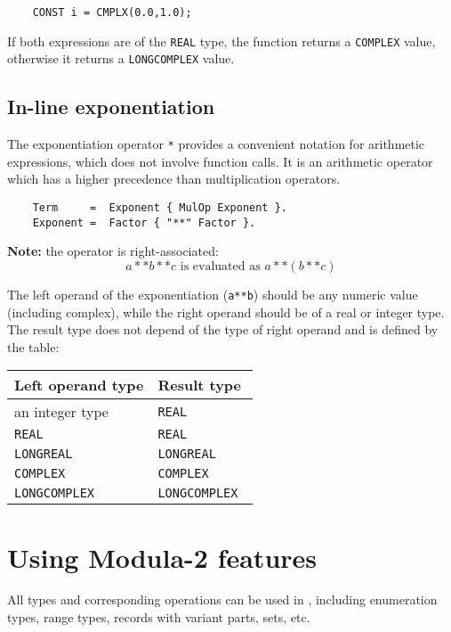 \verb'    CONST i = CMPLX(0.0,1.0);'

If both expressions are of the \verb'REAL' type, the function
returns a \verb'COMPLEX' value, otherwise it returns a
\verb'LONGCOMPLEX' value.

\subsection{In-line exponentiation}

\onumextonly{}

The exponentiation operator {\tt **} provides a convenient
notation for arithmetic expressions, which does not involve function
calls. It is an arithmetic operator which has a higher precedence
than multiplication operators.
\begin{verbatim}
    Term     =  Exponent { MulOp Exponent }.
    Exponent =  Factor { "**" Factor }.
\end{verbatim}
{\bf Note:} the operator is right-associated:
$$
  a**b**c \mbox{ is evaluated as } a**(b**c)
$$

The left operand of the exponentiation ({\tt a**b}) should be any
numeric value (including complex), while the right operand should
be of a real or integer type. The result type does not depend of
the type of right operand and is defined by the table:
\begin{center}
\begin{tabular}{ll}
\bf Left operand type & \bf Result type \\ \hline
an integer type     & \tt REAL \\
\tt REAL            & \tt REAL \\
\tt LONGREAL        & \tt LONGREAL \\
\tt COMPLEX         & \tt COMPLEX \\
\tt LONGCOMPLEX     & \tt LONGCOMPLEX \\
\end{tabular}
\end{center}

\section{Using Modula-2 features}\label{o2:usingm2}

All \mt{} types and corresponding operations can be used in \ot{},
including enumeration types, range types, records with variant parts,
sets, etc.

